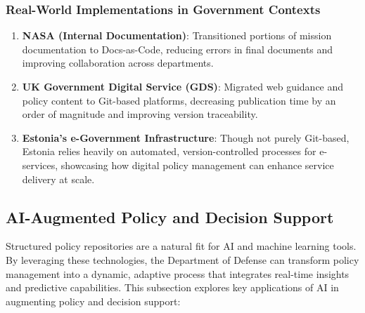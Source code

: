 \documentclass[11pt]{article}
\begin{document}
	\subsubsection{Real-World Implementations in Government Contexts}
	\begin{enumerate}
		\item \textbf{NASA (Internal Documentation)}: Transitioned portions of mission documentation to Docs-as-Code, reducing errors in final documents and improving collaboration across departments.
		\item \textbf{UK Government Digital Service (GDS)}: Migrated web guidance and policy content to Git-based platforms, decreasing publication time by an order of magnitude and improving version traceability.
		\item \textbf{Estonia's e-Government Infrastructure}: Though not purely Git-based, Estonia relies heavily on automated, version-controlled processes for e-services, showcasing how digital policy management can enhance service delivery at scale.
	\end{enumerate}

	\subsection{AI-Augmented Policy and Decision Support}

	Structured policy repositories are a natural fit for AI and machine learning tools. By leveraging these technologies, the Department of Defense can transform policy management into a dynamic, adaptive process that integrates real-time insights and predictive capabilities. This subsection explores key applications of AI in augmenting policy and decision support:
\end{document}
